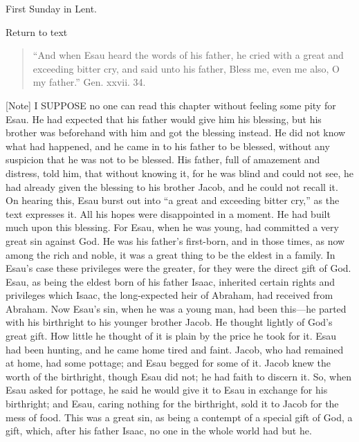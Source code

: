 
First Sunday in Lent.

Return to text


\begin{quote}

``And when Esau heard the words of his father, he cried with a
great and exceeding bitter cry, and said unto his father, Bless me,
even me also, O my father.'' Gen. xxvii. 34.

\end{quote}

[Note] I SUPPOSE no one can read
this chapter without feeling some pity for Esau. He had expected that
his father would give him his blessing, but his brother was beforehand
with him and got the blessing instead. He did not know what had
happened, and he came in to his father to be blessed, without any
suspicion that he was not to be blessed. His father, full of amazement
and distress, told him, that without knowing it, for he was blind and
could not see, he had already given the blessing to his brother Jacob,
and he could not recall it. On hearing this, Esau burst out into ``a
great and exceeding bitter cry,'' as the text expresses it. All his
hopes were disappointed in a moment. He had built much upon this
blessing. For Esau, when he was young, had committed a very great sin
against God. He was his father's first-born, and in those times, as now
among the rich and noble, it was a great thing to be the eldest in a
family. In Esau's case these privileges were the greater, for they were
the direct gift of God. Esau, as being the eldest born of his father
Isaac, inherited certain rights and privileges which Isaac, the
long-expected heir of Abraham, had received from Abraham. Now Esau's
sin, when he was a young man, had been this—he parted with his
birthright to his younger brother Jacob. He thought lightly of God's
great gift. How little he thought of it is plain by the price he took
for it. Esau had been hunting, and he came home tired and faint. Jacob,
who had remained at home, had some pottage; and Esau begged for some of
it. Jacob knew the worth of the birthright, though Esau did not; he had
faith to discern it. So, when Esau asked for pottage, he said he would
give it to Esau in exchange for his birthright; and Esau, caring nothing
for the birthright, sold it to Jacob for the mess of food. This was a
great sin, as being a contempt of a special gift of God, a gift, which,
after his father Isaac, no one in the whole world had but he.

